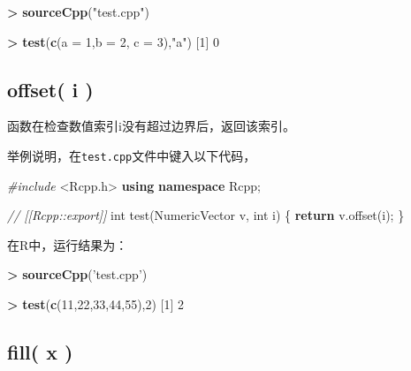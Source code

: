 \documentclass[]{ctexbook}
\newenvironment{Shaded}{\begin{snugshade}}{\end{snugshade}}
\newcommand{\KeywordTok}[1]{\textcolor[rgb]{0.13,0.29,0.53}{\textbf{#1}}}
\newcommand{\DataTypeTok}[1]{\textcolor[rgb]{0.13,0.29,0.53}{#1}}
\newcommand{\DecValTok}[1]{\textcolor[rgb]{0.00,0.00,0.81}{#1}}
\newcommand{\StringTok}[1]{\textcolor[rgb]{0.31,0.60,0.02}{#1}}
\newcommand{\ImportTok}[1]{#1}
\newcommand{\CommentTok}[1]{\textcolor[rgb]{0.56,0.35,0.01}{\textit{#1}}}
\newcommand{\ControlFlowTok}[1]{\textcolor[rgb]{0.13,0.29,0.53}{\textbf{#1}}}
\newcommand{\OperatorTok}[1]{\textcolor[rgb]{0.81,0.36,0.00}{\textbf{#1}}}
\newcommand{\PreprocessorTok}[1]{\textcolor[rgb]{0.56,0.35,0.01}{\textit{#1}}}
\newcommand{\NormalTok}[1]{#1}
\begin{document}
\begin{Shaded}
\begin{Highlighting}[]
\OperatorTok{>}\StringTok{ }\KeywordTok{sourceCpp}\NormalTok{(}\StringTok{"test.cpp"}\NormalTok{)}

\OperatorTok{>}\StringTok{ }\KeywordTok{test}\NormalTok{(}\KeywordTok{c}\NormalTok{(}\DataTypeTok{a =} \DecValTok{1}\NormalTok{,}\DataTypeTok{b =} \DecValTok{2}\NormalTok{, }\DataTypeTok{c =} \DecValTok{3}\NormalTok{),}\StringTok{"a"}\NormalTok{)}
\NormalTok{[}\DecValTok{1}\NormalTok{] }\DecValTok{0}
\end{Highlighting}
\end{Shaded}

\subsection{offset( i )}\label{offseti}

函数在检查数值索引i没有超过边界后，返回该索引。

举例说明，在\texttt{test.cpp}文件中键入以下代码，

\begin{Shaded}
\begin{Highlighting}[]
\PreprocessorTok{#include }\ImportTok{<Rcpp.h>}
\KeywordTok{using} \KeywordTok{namespace}\NormalTok{ Rcpp;}

\CommentTok{// [[Rcpp::export]]}
\DataTypeTok{int}\NormalTok{ test(NumericVector v, }\DataTypeTok{int}\NormalTok{ i) \{}
  \ControlFlowTok{return}\NormalTok{ v.offset(i);}
\NormalTok{\}}
\end{Highlighting}
\end{Shaded}

在R中，运行结果为：

\begin{Shaded}
\begin{Highlighting}[]
\OperatorTok{>}\StringTok{ }\KeywordTok{sourceCpp}\NormalTok{(}\StringTok{'test.cpp'}\NormalTok{)}

\OperatorTok{>}\StringTok{ }\KeywordTok{test}\NormalTok{(}\KeywordTok{c}\NormalTok{(}\DecValTok{11}\NormalTok{,}\DecValTok{22}\NormalTok{,}\DecValTok{33}\NormalTok{,}\DecValTok{44}\NormalTok{,}\DecValTok{55}\NormalTok{),}\DecValTok{2}\NormalTok{)}
\NormalTok{[}\DecValTok{1}\NormalTok{] }\DecValTok{2}
\end{Highlighting}
\end{Shaded}

\subsection{fill( x )}\label{fillx}
\end{document}
